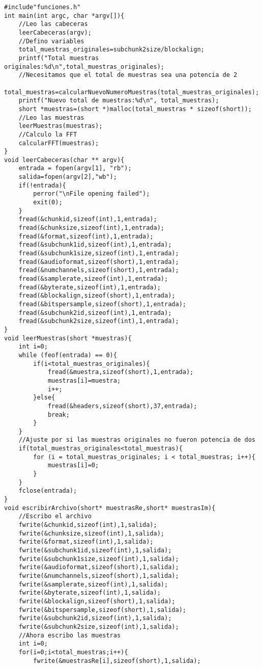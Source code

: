 \begin{lstlisting}[style=CStyle]
#include"funciones.h"
int main(int argc, char *argv[]){
	//Leo las cabeceras
	leerCabeceras(argv);
	//Defino variables
	total_muestras_originales=subchunk2size/blockalign;
	printf("Total muestras originales:%d\n",total_muestras_originales);
	//Necesitamos que el total de muestras sea una potencia de 2
	total_muestras=calcularNuevoNumeroMuestras(total_muestras_originales);
	printf("Nuevo total de muestras:%d\n", total_muestras);
	short *muestras=(short *)malloc(total_muestras * sizeof(short));
	//Leo las muestras
	leerMuestras(muestras);
	//Calculo la FFT
	calcularFFT(muestras);
}
void leerCabeceras(char ** argv){
	entrada = fopen(argv[1], "rb");
	salida=fopen(argv[2],"wb");
	if(!entrada){
		perror("\nFile opening failed");
		exit(0);
	}
	fread(&chunkid,sizeof(int),1,entrada);
	fread(&chunksize,sizeof(int),1,entrada);
	fread(&format,sizeof(int),1,entrada);
	fread(&subchunk1id,sizeof(int),1,entrada);
	fread(&subchunk1size,sizeof(int),1,entrada);
	fread(&audioformat,sizeof(short),1,entrada);
	fread(&numchannels,sizeof(short),1,entrada);
	fread(&samplerate,sizeof(int),1,entrada);
	fread(&byterate,sizeof(int),1,entrada);
	fread(&blockalign,sizeof(short),1,entrada);
	fread(&bitspersample,sizeof(short),1,entrada);
	fread(&subchunk2id,sizeof(int),1,entrada);
	fread(&subchunk2size,sizeof(int),1,entrada);
}
void leerMuestras(short *muestras){
	int i=0;
	while (feof(entrada) == 0){
		if(i<total_muestras_originales){
			fread(&muestra,sizeof(short),1,entrada);
			muestras[i]=muestra;
			i++;
		}else{
			fread(&headers,sizeof(short),37,entrada);
			break;
		}
	}
	//Ajuste por si las muestras originales no fueron potencia de dos
	if(total_muestras_originales<total_muestras){
		for (i = total_muestras_originales; i < total_muestras; i++){
			muestras[i]=0;
		}
	}
	fclose(entrada);
}
void escribirArchivo(short* muestrasRe,short* muestrasIm){
	//Escribo el archivo
	fwrite(&chunkid,sizeof(int),1,salida);
	fwrite(&chunksize,sizeof(int),1,salida);
	fwrite(&format,sizeof(int),1,salida);
	fwrite(&subchunk1id,sizeof(int),1,salida);
	fwrite(&subchunk1size,sizeof(int),1,salida);
	fwrite(&audioformat,sizeof(short),1,salida);
	fwrite(&numchannels,sizeof(short),1,salida);
	fwrite(&samplerate,sizeof(int),1,salida);
	fwrite(&byterate,sizeof(int),1,salida);
	fwrite(&blockalign,sizeof(short),1,salida);
	fwrite(&bitspersample,sizeof(short),1,salida);
	fwrite(&subchunk2id,sizeof(int),1,salida);
	fwrite(&subchunk2size,sizeof(int),1,salida);
	//Ahora escribo las muestras
	int i=0;
	for(i=0;i<total_muestras;i++){
		fwrite(&muestrasRe[i],sizeof(short),1,salida);

\end{lstlisting}
